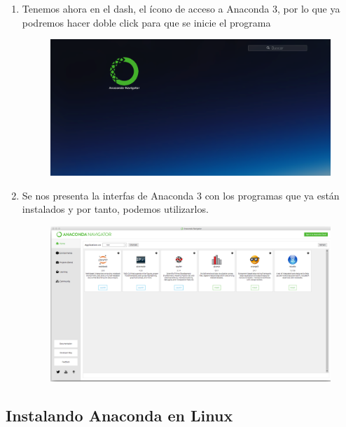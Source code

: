 \documentclass[12pt]{article}
\begin{document}
\begin{enumerate}
\item Tenemos ahora en el dash, el ícono de acceso a Anaconda 3, por lo que ya podremos hacer doble click para que se inicie el programa
\begin{figure}[H]
	\centering
	\includegraphics[scale=0.15]{Imagenes/Instalacion_Anaconda_01_iOS_12} 
\end{figure}
\item Se nos presenta la interfas de Anaconda 3 con los programas que ya están instalados y por tanto, podemos utilizarlos.
\begin{figure}[H]
	\centering
	\includegraphics[scale=0.15]{Imagenes/Instalacion_Anaconda_01_iOS_13} 
\end{figure}
\end{enumerate}

\subsection{Instalando Anaconda en Linux}
\end{document}
